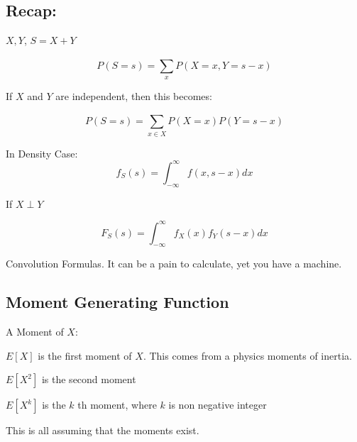 \documentclass{report}
\begin{document}
\subsection{Recap:}

$ X,Y $, $ S = X+Y $ 

\[
P(S=s) = \sum_{x}^{}P(X =x, Y=s-x)
\]

If $ X $ and $ Y $ are independent, then this becomes: 

\[
P(S=s) = \sum_{x \in X}^{} P(X=x)P(Y=s-x)
\]


In Density Case: 
\[
f_{S}(s) = \int_{-\infty }^{\infty }  f(x, s-x) dx
\]

If $ X \perp Y $ 

\[
F_{S}(s) = \int_{-\infty}^{\infty}f_{X}(x) f_{Y}(s-x) dx
\]

Convolution Formulas. It can be a pain to calculate, yet you have a machine.  

\subsection{Moment Generating Function}

A Moment of $ X $: 

$ E[X] $ is the first moment of $ X $. This comes from a physics moments of inertia. 

$ E[X^{2}] $ is the second moment 

$ E[X^{k}] $ is the $ k $ th moment, where $ k $ is non negative integer 


This is all assuming that the moments exist. 
\end{document}
